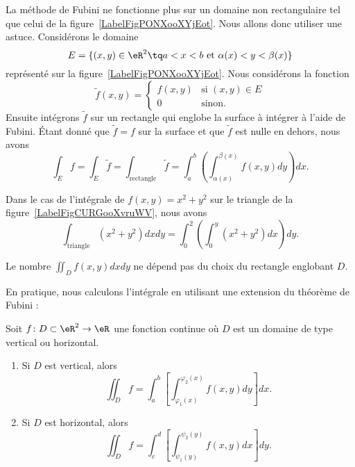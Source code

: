 \newcommand{\CaptionFigPONXooXYjEot}{Intégrer sur des domaines plus complexes.}


La méthode de Fubini ne fonctionne plus sur un domaine non rectangulaire tel que celui de la figure~\ref{LabelFigPONXooXYjEot}. Nous allons donc utiliser une astuce. Considérons le domaine \begin{equation}
	E=\{ (x,y)\in\eR^2\tq a<x<b\text{ et } \alpha(x)<y<\beta(x) \}
\end{equation}
représenté sur la figure~\ref{LabelFigPONXooXYjEot}. Nous considérons la fonction
\begin{equation}
	\tilde f(x,y)=\begin{cases}
	f(x,y)	&	\text{si }(x,y)\in E\\
	0	&	 \text{sinon.}
\end{cases}
\end{equation}
Ensuite intégrons $\tilde f$ sur un rectangle qui englobe la surface à intégrer à l'aide de Fubini. Étant donné que $\tilde f=f$ sur la surface et que $\tilde f$ est nulle en dehors, nous avons
\begin{equation}
	\int_Ef=\int_E\tilde f=\int_{\text{rectangle}}\tilde f=\int_a^b\left( \int_{\alpha(x)}^{\beta(x)}f(x,y)dy \right)dx.
\end{equation}

Dans le cas de l'intégrale de $f(x,y)=x^2+y^2$ sur le triangle de la figure~\ref{LabelFigCURGooXvruWV}, nous avons
\begin{equation}
	\int_{\text{triangle}}(x^2+y^2)dx dy=\int_0^2\left( \int_0^y(x^2+y^2)dx \right)dy.
\end{equation}

\begin{remark}
    Le nombre $\iint_{D}f(x,y)dxdy$ ne dépend pas du choix du rectangle englobant $D$.
\end{remark}

En pratique, nous calculons l'intégrale en utilisant une extension du théorème de Fubini :
\begin{theorem}
    Soit $f\colon D\subset\eR^2\to \eR$ une fonction continue où $D$ est un domaine de type vertical ou horizontal.
    \begin{enumerate}
        \item
            Si $D$ est vertical, alors
            \begin{equation}
                \iint_Df=\int_a^b\left[ \int_{\varphi_1(x)}^{\varphi_2(x)}f(x,y)dy \right]dx.
            \end{equation}
        \item
            Si $D$ est horizontal, alors
            \begin{equation}
                \iint_Df=\int_c^d\left[ \int_{\psi_1(y)}^{\psi_2(y)}f(x,y)dx \right]dy.
            \end{equation}
    \end{enumerate}

\end{theorem}

